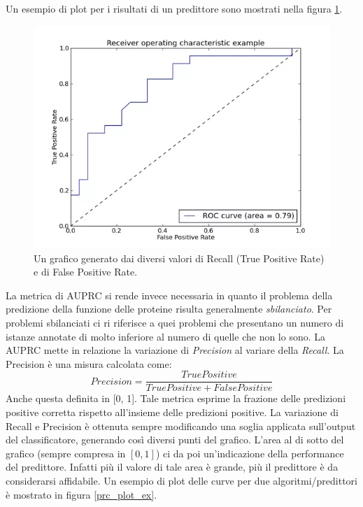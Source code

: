 \documentclass[12pt]{report}
\begin{document}
Un esempio di plot per i risultati di un predittore sono mostrati nella figura \ref{roc_plot_ex}.
\begin{figure}[h]
\center
\includegraphics[scale=0.38]{./images/Roccurves.png}
\caption{\footnotesize{Un grafico generato dai diversi valori di Recall (True Positive Rate) e di False Positive Rate.}}
\label{roc_plot_ex}
\end{figure}
\newline
\newline
La metrica di AUPRC si rende invece necessaria in quanto il problema della predizione della funzione delle proteine risulta generalmente \emph{sbilanciato}. Per problemi sbilanciati ci ri riferisce a quei problemi che presentano un numero di istanze annotate di molto inferiore al numero di quelle che non lo sono. La AUPRC mette in relazione la variazione di \emph{Precision} al variare della \emph{Recall}. La Precision è una misura calcolata come:
\[
Precision = \frac{TruePositive}{TruePositive+FalsePositive}
\]
Anche questa definita in [0, 1]. Tale metrica esprime la frazione delle predizioni positive corretta rispetto all'insieme delle predizioni positive.
\newline
\newline
La variazione di Recall e Precision è ottenuta sempre modificando una soglia applicata sull'output del classificatore, generando così diversi punti del grafico. L'area al di sotto del grafico (sempre compresa in $[0,1]$) ci da poi un'indicazione della performance del predittore. Infatti più il valore di tale area è grande, più il predittore è da considerarsi affidabile. Un esempio di plot delle curve per due algoritmi/predittori è mostrato in figura \ref{prc_plot_ex}.
\end{document}
